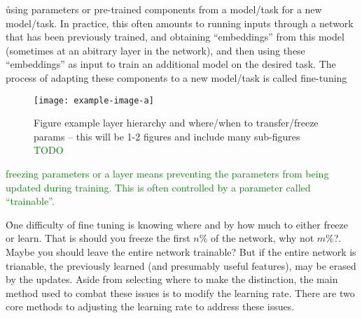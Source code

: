 



\r{using parameters or pre-trained components from a model/task for a new model/task.  In practice, this often amounts to running inputs through a network that has been previously trained, and obtaining ``embeddings'' from this model (sometimes at an abitrary layer in the network), and then using these ``embeddings'' as input to train an additional model on the desired task. The process of adapting these components to a new model/task is called fine-tuning}


\begin{figure}[htp]
	\centering
	\texttt{[image: example-image-a]}\hfil
	\caption{Figure example layer hierarchy and where/when to transfer/freeze params -- this will be 1-2 figures and include many sub-figures \textcolor{green}{TODO}}
	\label{fig:transfer_learning_subfigs_a}
\end{figure}

\textcolor{green}{{freezing} parameters or a layer means preventing the parameters from being updated during training. This is often controlled by a parameter called ``trainable''.}



\r{One difficulty of fine tuning is knowing where and by how much to either freeze or learn. That is should you freeze the first $n\%$ of the network, why not $m\%$?. Maybe you should leave the entire network trainable? But if the entire network is trianable, the previously learned (and presumably useful features), may be erased by the updates. Aside from selecting where to make the distinction, the main method used to combat these issues is to modify the learning rate. There are two core methods to adjusting the learning rate to address these issues.}

